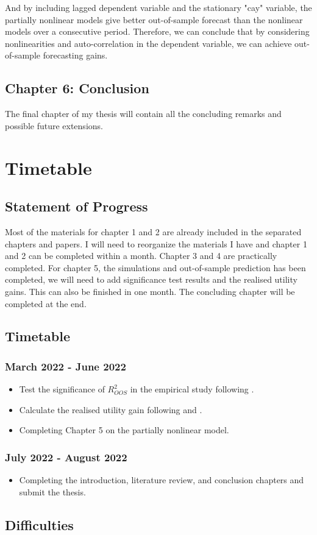 \documentclass[a4paper,12pt,times,numbered,print,index]{report}
\numberwithin{equation}{section}
\begin{document}
And by including lagged dependent variable and the stationary "cay" variable, the partially nonlinear models give better out-of-sample forecast than the nonlinear models over a consecutive period. Therefore, we can conclude that by considering nonlinearities and auto-correlation in the dependent variable, we can achieve out-of-sample forecasting gains.

\pagebreak

\subsection*{Chapter 6: Conclusion}
The final chapter of my thesis will contain all the concluding remarks and possible future extensions.
\pagebreak

\section{Timetable}
\subsection{Statement of Progress}
Most of the materials for chapter 1 and 2 are already included in the separated chapters and papers. I will need to reorganize the materials I have and chapter 1 and 2 can be completed within a month. Chapter 3 and 4 are practically completed. For chapter 5, the simulations and out-of-sample prediction has been completed, we will need to add significance test results and the realised utility gains. This can also be finished in one month. The concluding chapter will be completed at the end.  

\subsection{Timetable}
\subsubsection{March 2022 - June 2022}
\begin{itemize}
    \item Test the significance of $R^{2}_{OOS}$ in the empirical study following \cite{clark2007approximately}.
    \item Calculate the realised utility gain following \cite{campbell2008predicting} and \cite{neely2014forecasting}.
    \item Completing Chapter 5 on the partially nonlinear model.
\end{itemize}
\subsubsection {July 2022 - August 2022}
\begin{itemize}
    \item Completing the introduction, literature review, and conclusion chapters and submit the thesis.
\end{itemize}

\subsection{Difficulties}


{\footnotesize
	
	
}
	
\end{document}
